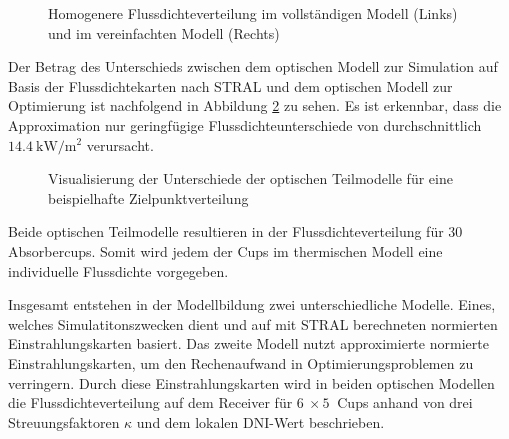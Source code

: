 \enlargethispage{\baselineskip}
\begin{figure}[h!]
    \centering
    \setlength{\fboxsep}{1pt}
    \setlength{\fboxrule}{1pt}
    \caption[Homogenere Flussdichteverteilung im vollständigen Modell und im vereinfachten Modell]{Homogenere Flussdichteverteilung im vollständigen Modell (Links) und im vereinfachten Modell (Rechts)}
    \label{fig_dispersionSTRAL36300605}
\end{figure}

Der Betrag des Unterschieds zwischen dem optischen Modell zur Simulation auf Basis der Flussdichtekarten nach STRAL und dem optischen Modell zur Optimierung ist nachfolgend in Abbildung \ref{fig_UnterschiedoptischeModelle} zu sehen.
Es ist erkennbar, dass die Approximation nur geringfügige Flussdichteunterschiede von durchschnittlich $\SI{14.4}{\kilo\watt\per\metre\squared}$ verursacht.

\begin{figure}[h!]
    \centering
    \setlength{\fboxsep}{1pt}
    \setlength{\fboxrule}{1pt}
    \caption[Visualisierung der Unterschiede der optischen Teilmodelle für eine beispielhafte Zielpunktverteilung]{Visualisierung der Unterschiede der optischen Teilmodelle für eine beispielhafte Zielpunktverteilung}
    \label{fig_UnterschiedoptischeModelle}
\end{figure}

Beide optischen Teilmodelle resultieren in der Flussdichteverteilung für $30$ Absorbercups.
Somit wird jedem der Cups im thermischen Modell eine individuelle Flussdichte vorgegeben.


Insgesamt entstehen in der Modellbildung zwei unterschiedliche Modelle.
Eines, welches Simulatitonszwecken dient und auf mit STRAL berechneten normierten Einstrahlungskarten basiert.
Das zweite Modell nutzt approximierte normierte Einstrahlungskarten, um den Rechenaufwand in Optimierungsproblemen zu verringern.
Durch diese Einstrahlungskarten wird in beiden optischen Modellen die Flussdichteverteilung auf dem Receiver für $\SI{6}{} \times \SI{5}{}$ Cups anhand von drei Streuungsfaktoren $\kappa$ und dem lokalen DNI-Wert beschrieben.

